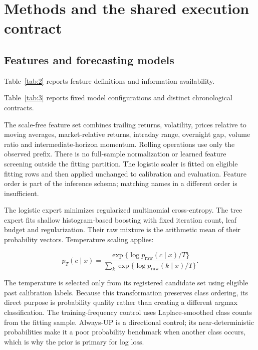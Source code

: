 \section{Methods and the shared execution contract}\label{sec:section-04}

\subsection{Features and forecasting models}

\noindent Table~\ref{tab:2} reports feature definitions and information availability.



\noindent Table~\ref{tab:3} reports fixed model configurations and distinct chronological contracts.



The scale-free feature set combines trailing returns, volatility, prices relative to moving averages, market-relative returns, intraday range, overnight gap, volume ratio and intermediate-horizon momentum. Rolling operations use only the observed prefix. There is no full-sample normalization or learned feature screening outside the fitting partition. The logistic scaler is fitted on eligible fitting rows and then applied unchanged to calibration and evaluation. Feature order is part of the inference schema; matching names in a different order is insufficient.

The logistic expert minimizes regularized multinomial cross-entropy. The tree expert fits shallow histogram-based boosting with fixed iteration count, leaf budget and regularization. Their raw mixture is the arithmetic mean of their probability vectors. Temperature scaling applies:

\begin{equation}\label{eq:temperature}p_T(c\mid x)=\frac{\exp\{\log p_{\mathrm{raw}}(c\mid x)/T\}}{\sum_k\exp\{\log p_{\mathrm{raw}}(k\mid x)/T\}}.\end{equation}

The temperature is selected only from its registered candidate set using eligible past calibration labels. Because this transformation preserves class ordering, its direct purpose is probability quality rather than creating a different argmax classification. The training-frequency control uses Laplace-smoothed class counts from the fitting sample. Always-UP is a directional control; its near-deterministic probabilities make it a poor probability benchmark when another class occurs, which is why the prior is primary for log loss.

